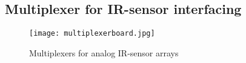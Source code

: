 \documentclass[../report.tex]{subfiles}
\begin{document}
\subsection{Multiplexer for IR-sensor interfacing}

\begin{figure}[h!]
    \centering
    \texttt{[image: multiplexerboard.jpg]}
    \caption{Multiplexers for analog IR-sensor arrays}
 \end{figure}
\end{document}
